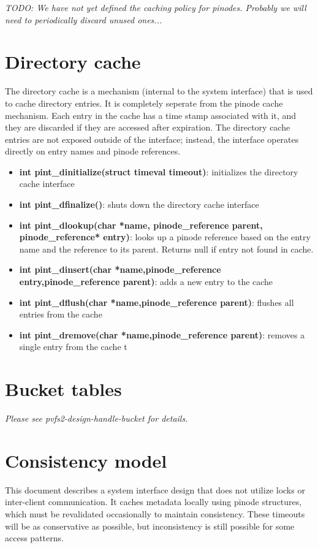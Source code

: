 \documentclass[11pt, letterpaper]{article}
\begin{document}
\emph{TODO: We have not yet defined the caching policy for pinodes.  Probably
we will need to periodically discard unused ones...}

\section{Directory cache}

The directory cache is a mechanism (internal to the system
interface) that is used to cache directory entries.  It is
completely seperate from the pinode cache mechanism.  Each entry
in the cache has a time stamp associated with it, and they are
discarded if they are accessed after expiration.  The directory
cache entries are not exposed outside of the interface; instead,
the interface operates directly on entry names and pinode references.

\begin{itemize}
\item \textbf{int pint\_dinitialize(struct timeval timeout)}:
initializes the directory cache interface
\item \textbf{int pint\_dfinalize()}:  shuts down the directory
cache interface
\item \textbf{int pint\_dlookup(char *name,
pinode\_reference parent, pinode\_reference* entry)}:  looks up a pinode reference based on
the entry name and the reference to its parent.  Returns null if
entry not found in cache.
\item \textbf{int pint\_dinsert(char *name,pinode\_reference
entry,pinode\_reference parent)}:  adds a new entry to the cache
\item \textbf{int pint\_dflush(char *name,pinode\_reference
parent)}:  flushes all entries from the cache
\item \textbf{int pint\_dremove(char *name,pinode\_reference
parent)}:  removes a single entry from the cache
t
\end{itemize}

\section{Bucket tables}

\emph{Please see pvfs2-design-handle-bucket for details.}

\section{Consistency model}

This document describes a system interface design that does not utilize
locks or inter-client communication.  It caches metadata locally using
pinode structures, which must be revalidated occasionally to maintain
consistency.  These timeouts will be as conservative as possible, but
inconsistency is still possible for some access patterns.
\end{document}

